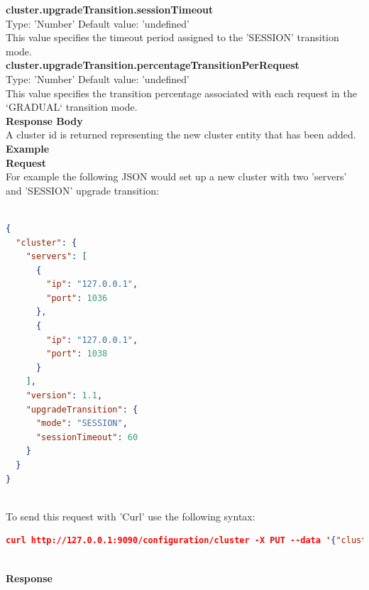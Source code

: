 \documentclass[a4paper,11pt,twoside]{article}
\begin{document}
\noindent
\textbf{cluster.upgradeTransition.sessionTimeout}\\
\noindent
Type: 'Number' Default value: 'undefined'\\
\noindent
This value specifies the timeout period assigned to the 'SESSION' transition mode. \\

\noindent
\textbf{cluster.upgradeTransition.percentageTransitionPerRequest}\\
\noindent
Type: 'Number' Default value: 'undefined'\\
\noindent
This value specifies the transition percentage associated with each request in the `GRADUAL` transition mode. \\

\noindent
\textbf{Response Body}\\
\noindent
A cluster id is returned representing the new cluster entity that has been added. \\

\noindent
\textbf{Example}\\

\noindent
\textbf{Request}\\
\noindent
For example the following JSON would set up a new cluster with two 'servers' and 'SESSION' upgrade transition:

\begin{lstlisting}[language=json,firstnumber=1]

{
  "cluster": {
    "servers": [
      {
        "ip": "127.0.0.1", 
        "port": 1036
      },  
      {
        "ip": "127.0.0.1", 
        "port": 1038
      }
    ], 
    "version": 1.1, 
    "upgradeTransition": {
      "mode": "SESSION", 
      "sessionTimeout": 60
    }
  }
}
\end{lstlisting}

\noindent \\
To send this request with 'Curl' use the following syntax:\\

\begin{lstlisting}[language=json,firstnumber=1]
curl http://127.0.0.1:9090/configuration/cluster -X PUT --data '{"cluster": {"servers":[{"ip": "127.0.0.1", "port": 1036},{"ip": "127.0.0.1", "port": 1038}],"version": 1.1,"upgradeTransition": { "mode": "SESSION", "sessionTimeout": 60 }}}'
\end{lstlisting}

\noindent \\
\textbf{Response}\\
\end{document}
